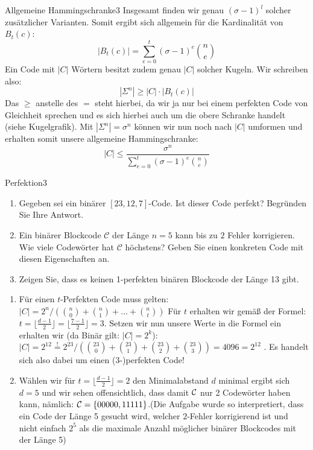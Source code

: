 \begin{aufgabe}{Allgemeine Hammingschranke}{3}
Insgesamt finden wir genau $(\sigma -1)^l$ solcher zusätzlicher Varianten. Somit ergibt sich allgemein für die Kardinalität von $B_t(c)$: $$|B_t(c)| = \sum\limits_{e=0}^t(\sigma-1)^e \binom{n}{e}$$
Ein Code mit $|C|$ Wörtern besitzt zudem genau $|C|$ solcher Kugeln. Wir schreiben also: $$|\Sigma^n| \geq |C|\cdot |B_t(c)|$$
Das $\geq$ anstelle des $=$ steht hierbei, da wir ja nur bei einem perfekten Code von Gleichheit sprechen und es sich hierbei auch um die obere Schranke handelt (siehe Kugelgrafik). Mit $|\Sigma^n| = \sigma^n$ können wir nun noch nach $|C|$ umformen und erhalten somit unsere allgemeine Hammingschranke: 
$$|C| \leq \frac{\sigma^n}{\sum_{e=0}^t(\sigma-1)^e \binom{n}{e}}$$
\end{aufgabe}

\begin{aufgabe}{Perfektion}{3}
\vspace{-1\baselineskip}
\begin{enumerate}[label=\alph*)]\narrowitems
\item Gegeben sei ein binärer \([23,12,7]\)-Code. Ist dieser Code perfekt?
        Begründen Sie Ihre Antwort.
\item Ein binärer Blockcode \(\mathcal{C}\) der Länge \(n=5\) kann bis zu \(2\)
        Fehler korrigieren. Wie viele Codewörter hat \(\mathcal{C}\) höchstens?
        Geben Sie einen konkreten Code mit diesen Eigenschaften an.
\item Zeigen Sie, dass es keinen 1-perfekten binären Blockcode der Länge 13 gibt.
\end{enumerate}
\Splitter
\vspace{-1\baselineskip}
\begin{enumerate}[label=\alph*)]\narrowitems
    \item Für einen \(t\)-Perfekten Code muss gelten: \\
          \(|C| = 2^n \Big/ \left(\binom{n}{0} + \binom{n}{1} + \ldots + \binom{n}{t}\right)\) 
          Für \(t\) erhalten wir gemäß der Formel: \(t = \lfloor \frac{d-1}{2} \rfloor = \lfloor \frac{7-1}{2}\rfloor = 3\). Setzen wir nun unsere Werte in die Formel ein erhalten wir (da Binär gilt: \(|C| = 2^k\)): \\
          \(|C| = 2^{12} \overset{!}{=} 2^{23} \Big/ \left(\binom{23}{0} + \binom{23}{1} + \binom{23}{2} + \binom{23}{3}\right) = 4096 = 2^{12}\) . Es handelt sich also dabei um einen (\(3\)-)perfekten Code!
    \item Wählen wir für \(t = \lfloor \frac{d-1}{2} \rfloor = 2\) den Minimalabstand \(d\) minimal ergibt sich \(d=5\) und wir sehen offensichtlich, dass damit \({\cal C}\) nur 2 Codewörter haben kann, nämlich: \({\cal C} = \{00000,11111\}\).(Die Aufgabe wurde so interpretiert, dass ein Code der Länge 5 gesucht wird, welcher \(2\)-Fehler korrigierend ist und nicht einfach \(2^5\) als die maximale Anzahl möglicher binärer Blockcodes mit der Länge 5)

\end{enumerate}
\end{aufgabe}
